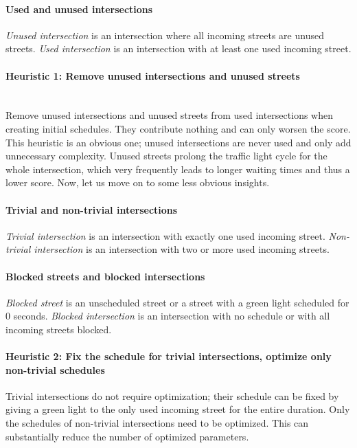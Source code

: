 \paragraph{Used and unused intersections} \textit{Unused intersection} is an intersection where all incoming streets are unused streets. \textit{Used intersection} is an intersection with at least one used incoming street.

\paragraph{Heuristic 1: Remove unused intersections and unused streets} \label{para:heuristic_1} \mbox{} \\
Remove unused intersections and unused streets from used intersections when creating initial schedules. They contribute nothing and can only worsen the score. \\

This heuristic is an obvious one; unused intersections are never used and only add unnecessary complexity. Unused streets prolong the traffic light cycle for the whole intersection, which very frequently leads to longer waiting times and thus a lower score. Now, let us move on to some less obvious insights.

\paragraph{Trivial and non-trivial intersections} \textit{Trivial intersection} is an intersection with exactly one used incoming street. \textit{Non-trivial intersection} is an intersection with two or more used incoming streets.

\paragraph{Blocked streets and blocked intersections} \textit{Blocked street} is an unscheduled street or a street with a green light scheduled for 0 seconds. \textit{Blocked intersection} is an intersection with no schedule or with all incoming streets blocked.

\paragraph{Heuristic 2: Fix the schedule for trivial intersections, optimize only non-trivial schedules} \label{para:heuristic_2}
Trivial intersections do not require optimization; their schedule can be fixed by giving a green light to the only used incoming street for the entire duration. Only the schedules of non-trivial intersections need to be optimized. This can substantially reduce the number of optimized parameters. \\

